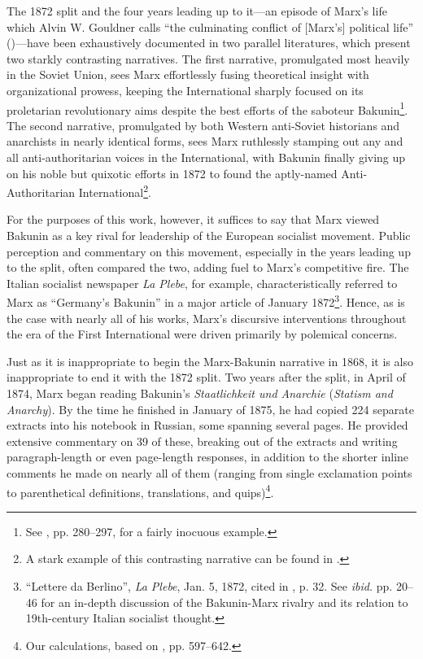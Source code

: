 The 1872 split and the four years leading up to it---an episode of Marx's life which Alvin W. Gouldner calls ``the culminating conflict of [Marx's] political life'' (\cite{gouldner_marxs_1982})---have been exhaustively documented in two parallel literatures, which present two starkly contrasting narratives. The first narrative, promulgated most heavily in the Soviet Union, sees Marx effortlessly fusing theoretical insight with organizational prowess, keeping the International sharply focused on its proletarian revolutionary aims despite the best efforts of the saboteur Bakunin\footnote{See \cite{nicolaievsky_karl_1936}, pp. 280--297, for a fairly inocuous example.}. The second narrative, promulgated by both Western anti-Soviet historians and anarchists in nearly identical forms, sees Marx ruthlessly stamping out any and all anti-authoritarian voices in the International, with Bakunin finally giving up on his noble but quixotic efforts in 1872 to found the aptly-named Anti-Authoritarian International\footnote{A stark example of this contrasting narrative can be found in \cite{eckhardt_first_2016}.}.

For the purposes of this work, however, it suffices to say that Marx viewed Bakunin as a key rival for leadership of the European socialist movement. Public perception and commentary on this movement, especially in the years leading up to the split, often compared the two, adding fuel to Marx's competitive fire. The Italian socialist newspaper \textit{La Plebe}, for example, characteristically referred to Marx as ``Germany's Bakunin'' in a major article of January 1872\footnote{``Lettere da Berlino'', \textit{La Plebe}, Jan. 5, 1872, cited in \cite{favilli_history_1996}, p. 32. See \textit{ibid.} pp. 20--46 for an in-depth discussion of the Bakunin-Marx rivalry and its relation to 19th-century Italian socialist thought.}. Hence, as is the case with nearly all of his works, Marx's discursive interventions throughout the era of the First International were driven primarily by polemical concerns. 

Just as it is inappropriate to begin the Marx-Bakunin narrative in 1868, it is also inappropriate to end it with the 1872 split. Two years after the split, in April of 1874, Marx began reading Bakunin's \textit{Staatlichkeit und Anarchie} (\textit{Statism and Anarchy}). By the time he finished in January of 1875, he had copied 224 separate extracts into his notebook in Russian, some spanning several pages. He provided extensive commentary on 39 of these, breaking out of the extracts and writing paragraph-length or even page-length responses, in addition to the shorter inline comments he made on nearly all of them (ranging from single exclamation points to parenthetical definitions, translations, and quips)\footnote{Our calculations, based on , pp. 597--642.}.



